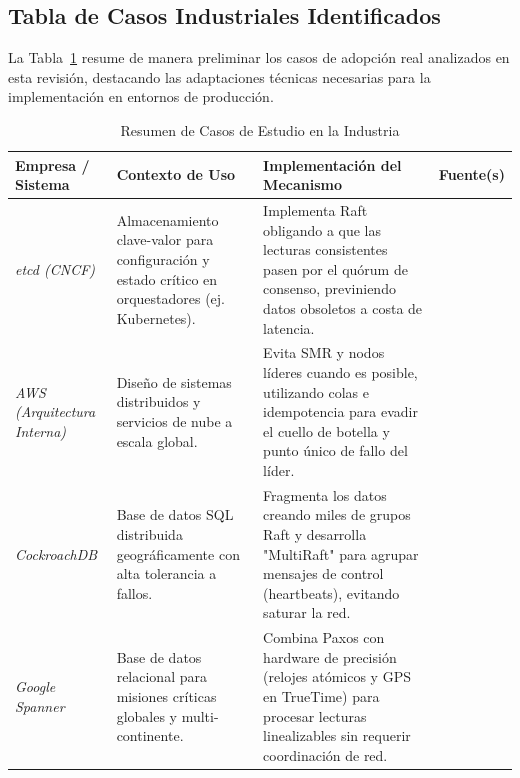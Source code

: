 \documentclass[12pt,letterpaper]{article}
\begin{document}
\subsection{Tabla de Casos Industriales Identificados}
La Tabla~\ref{tab:casos_industriales} resume de manera preliminar los casos de adopción real analizados en esta revisión, destacando las adaptaciones técnicas necesarias para la implementación en entornos de producción.

\begin{table}[htbp]
\centering
\caption{Resumen de Casos de Estudio en la Industria}
\label{tab:casos_industriales}
\small
\begin{tabular}{|p{2.5cm}|p{3.5cm}|p{5cm}|p{2cm}|}
\hline
\textbf{Empresa / Sistema} & \textbf{Contexto de Uso} & \textbf{Implementación del Mecanismo} & \textbf{Fuente(s)} \\ \hline

\textit{etcd (CNCF)} & Almacenamiento clave-valor para configuración y estado crítico en orquestadores (ej. Kubernetes). & Implementa Raft obligando a que las lecturas consistentes pasen por el quórum de consenso, previniendo datos obsoletos a costa de latencia. & \cite{etcd2021} \\ \hline

\textit{AWS (Arquitectura Interna)} & Diseño de sistemas distribuidos y servicios de nube a escala global. & Evita SMR y nodos líderes cuando es posible, utilizando colas e idempotencia para evadir el cuello de botella y punto único de fallo del líder. & \cite{brooker2020} \\ \hline

\textit{CockroachDB} & Base de datos SQL distribuida geográficamente con alta tolerancia a fallos. & Fragmenta los datos creando miles de grupos Raft y desarrolla "MultiRaft" para agrupar mensajes de control (heartbeats), evitando saturar la red. & \cite{cockroach2015} \\ \hline

\textit{Google Spanner} & Base de datos relacional para misiones críticas globales y multi-continente. & Combina Paxos con hardware de precisión (relojes atómicos y GPS en TrueTime) para procesar lecturas linealizables sin requerir coordinación de red. & \cite{srivastava2023} \\ \hline

\end{tabular}
\end{table}

\end{document}
